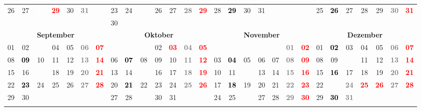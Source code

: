 \documentclass[10pt,a4paper,landscape]{article}
\newcommand{\yb}[1]{\cellcolor{yellow}\textcolor{black}{\bf #1}}
\newcommand{\iv}[1]{\cellcolor{black}\textcolor{white}{\bf #1}}
\newcommand{\rb}[1]{\textbf{\textcolor{red}{#1}}}
\newcommand{\hv}[1]{\textbf{\textcolor{Gray}{#1}}}
\begin{document}
\begin{tabular}{|ccccccc|ccccccc|ccccccc|ccccccc|}
26 & 27 & \iv{28} & \rb{29} & 30 & \hv{31} & & 23 & 24 & \iv{25} & 26 & 27 & \hv{28} & \rb{29} & 28 & \yb{29} & 30 & 31 & & & & 25 & \yb{26} & 27 & 28 & 29 & \hv{30} & \rb{31} \\
& & & & & & & 30 & & & & & & & & & & & & & & & & & & & &  \\
\hline
\multicolumn{7}{|c|}{\bf September} & \multicolumn{7}{|c|}{\bf Oktober} & \multicolumn{7}{|c|}{\bf November} & \multicolumn{7}{|c|}{\bf Dezember} \\
01 & 02 & \iv{03} & 04 & 05 & \hv{06} & \rb{07} & & & \iv{01} & 02 & \rb{03} & \hv{04} & \rb{05} & & & & & & \hv{01} & \rb{02} & 01 & \yb{02} & 03 & 04 & 05 & \hv{06} & \rb{07} \\
08 & \yb{09} & 10 & 11 & 12 & \hv{13} & \rb{14} & 06 & \yb{07} & 08 & 09 & 10 & \hv{11} & \rb{12} & 03 & \yb{04} & 05 & 06 & 07 & \hv{08} & \rb{09} & 08 & 09 & \iv{10} & 11 & 12 & \hv{13} & \rb{14} \\
15 & 16 & \iv{17} & 18 & 19 & \hv{20} & \rb{21} & 13 & 14 & \iv{15} & 16 & 17 & \hv{18} & \rb{19} & 10 & 11 & \iv{12} & 13 & 14 & \hv{15} & \rb{16} & 15 & \yb{16} & 17 & 18 & 19 & \hv{20} & \rb{21} \\
22 & \yb{23} & 24 & 25 & 26 & \hv{27} & \rb{28} & 20 & \yb{21} & 22 & 23 & 24 & \hv{25} & \rb{26} & 17 & \yb{18} & 19 & 20 & 21 & \hv{22} & \rb{23} & 22 & \iv{23} & \hv{24} & \rb{25} & \rb{26} & \hv{27} & \rb{28} \\
29 & 30 & & & & & & 27 & 28 & \iv{29} & 30 & 31 & & & 24 & 25 & \iv{26} & 27 & 28 & \hv{29} & \rb{30} & 29 & \yb{30} & \hv{31} & & & &  \\
& & & & & & & & & & & & & & & & & & & & & & & & & & &  \\
\hline
\end{tabular}
\end{document}

